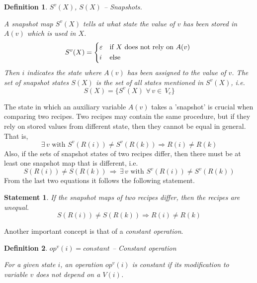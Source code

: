 \documentclass[12pt,a4paper]{scrartcl}
\newtheorem{definition}{Definition}
\newtheorem{statement}{Statement}
\begin{document}
\begin{definition} $S^v(X)$, $S(X)$ -- Snapshots.

    A \textit{snapshot map} $S^v(X)$ tells at what state the value of $v$ has
    been stored in $A(v)$ which is used in $X$. 
    \begin{equation}
        S^v(X) = \begin{dcases*}
                   \varepsilon & if $X$ does not rely on $A(v)$ \\
                   i           & else
                 \end{dcases*}
    \end{equation}
    Then $i$ indicates the state where $A(v)$ has been assigned to the value of $v$.
    The \textit{set of snapshot states} $S(X)$ is the set of all states mentioned in
    $S^v(X)$, i.e.
    \begin{equation}
        \label{eq:snapshot-map-1}
        S(X) = \{ S^v(X) \,\,\forall\,v\in\,V_c\}
    \end{equation}

\end{definition}
The state in which an auxiliary variable $A(v)$ takes a 'snapshot' is crucial when
comparing two recipes. Two recipes may contain the same procedure, but if they rely on
stored values from different state, then they cannot be equal in general. That is, 
\begin{equation} \label{eq:snapshot-map-difference}
   \exists\,v\,\,\mbox{with}\,\,S^v(R(i)) \neq S^v(R(k)) \Rightarrow R(i) \neq R(k)
\end{equation}
Also, if the sets of snapshot states of two recipes differ, then there must be 
at least one snapshot map that is different, i.e.
\begin{equation} \label{eq:snapshot-map-difference-2b}
   S(R(i)) \neq S(R(k)) \,\Rightarrow\,\exists\,v\,\,\mbox{with}\,\,S^v(R(i)) \neq S^v(R(k)) 
\end{equation}
From the last two equations it follows the following statement.
\begin{statement}
   If the snapshot maps of two recipes differ, then the recipes are unequal. 
   \begin{equation} \label{eq:snapshot-map-difference3}
       S(R(i)) \neq S(R(k)) \Rightarrow R(i) \neq R(k)
   \end{equation}
\end{statement}
Another important concept is that of a \textit{constant operation}.
\begin{definition} $op^v(i) = constant$ -- Constant operation \label{def:constant-operation}

    For a given state $i$, an operation $op^v(i)$ is constant if its
    modification to variable $v$ does not depend on a $V(i)$. 

\end{definition}
\end{document}
